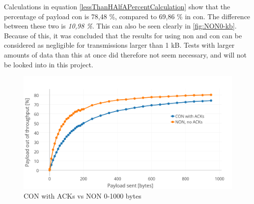 \noindent Calculations in equation \ref{lessThanHAlfAPercentCalculation} show that the percentage of \gls{payload} \gls{con} is 78,48 \%, compared to 69,86 \% in \gls{con}. The difference between these two is \textit{10,98 \%}. This can also be seen clearly in \ref{fig:NON0-kb}. Because of this, it was concluded that the results for using \gls{non} and \gls{con} can be considered as negligible for transmissions larger than 1 kB. Tests with larger amounts of data than this at once did therefore not seem necessary, and will not be looked into in this project. 



\begin{figure}[ht]
    \centering
    \includegraphics[width=1.0\textwidth]{CONNON0-kwithACK.png}    
    \caption{CON with ACKs vs NON 0-1000 bytes}
    \label{fig:NON0-kb2}
\end{figure}


